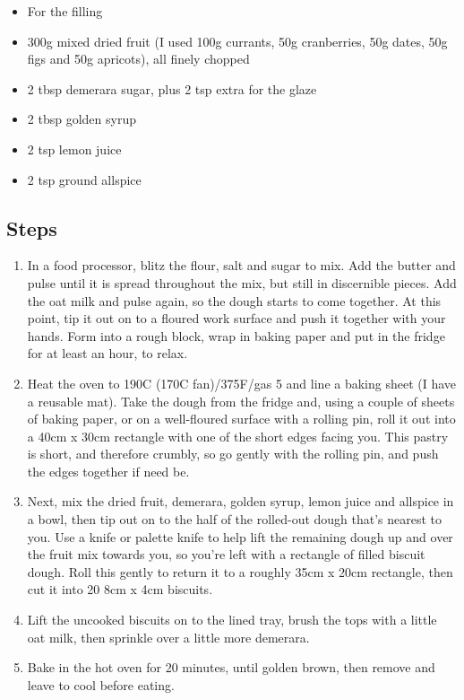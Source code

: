 \documentclass{book}
\begin{document}
\begin{itemize}
\item For the filling
\item 300g mixed dried fruit (I used 100g currants, 50g cranberries, 50g dates, 50g figs and 50g apricots), all finely chopped
\item 2 tbsp demerara sugar, plus 2 tsp extra for the glaze
\item 2 tbsp golden syrup
\item 2 tsp lemon juice
\item 2 tsp ground allspice
\end{itemize}

\subsection*{Steps}
\begin{enumerate}
\item In a food processor, blitz the flour, salt and sugar to mix. Add the butter and pulse until it is spread throughout the mix, but still in discernible pieces. Add the oat milk and pulse again, so the dough starts to come together. At this point, tip it out on to a floured work surface and push it together with your hands. Form into a rough block, wrap in baking paper and put in the fridge for at least an hour, to relax.
\item Heat the oven to 190C (170C fan)/375F/gas 5 and line a baking sheet (I have a reusable mat). Take the dough from the fridge and, using a couple of sheets of baking paper, or on a well-floured surface with a rolling pin, roll it out into a 40cm x 30cm rectangle with one of the short edges facing you. This pastry is short, and therefore crumbly, so go gently with the rolling pin, and push the edges together if need be.
\item Next, mix the dried fruit, demerara, golden syrup, lemon juice and allspice in a bowl, then tip out on to the half of the rolled-out dough that’s nearest to you. Use a knife or palette knife to help lift the remaining dough up and over the fruit mix towards you, so you’re left with a rectangle of filled biscuit dough. Roll this gently to return it to a roughly 35cm x 20cm rectangle, then cut it into 20 8cm x 4cm biscuits.
\item Lift the uncooked biscuits on to the lined tray, brush the tops with a little oat milk, then sprinkle over a little more demerara.
\item Bake in the hot oven for 20 minutes, until golden brown, then remove and leave to cool before eating.
\end{enumerate}
\newpage
\end{document}
